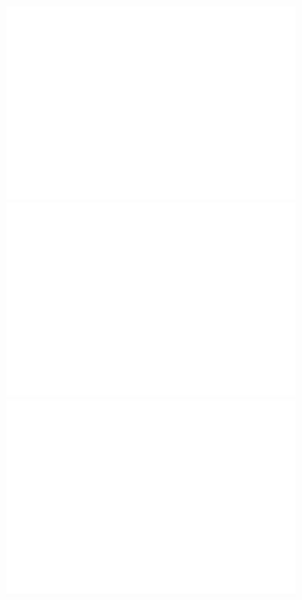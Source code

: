 \documentclass[aspectratio=1610, 9pt]{beamer}
\begin{document}
\begin{frame}
  \begin{figure}
  \begin{minipage}{\textwidth}
    \centering
    \begin{minipage}{0.46\textwidth}
      \includegraphics[width=0.85\textwidth]{images/mask.pdf}
    \end{minipage}
    \begin{minipage}{0.46\textwidth}
      \includegraphics[width=0.85\textwidth]{images/other.pdf}
    \end{minipage}
  \end{minipage}
  \begin{minipage}{\textwidth}
    \centering
    \begin{minipage}{0.46\textwidth}
      \includegraphics[width=0.85\textwidth]{images/nomask.pdf}

\end{minipage}
\end{minipage}
\end{figure}
\end{frame}
\end{document}
